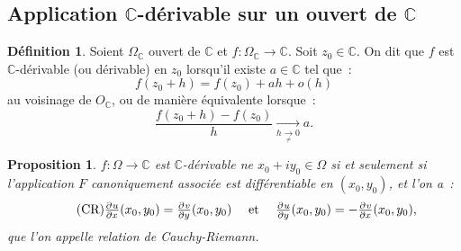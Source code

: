 \documentclass{report}
\newtheorem{prp}[thm]{Proposition}
\theoremstyle{definition}
\newtheorem{déf}[thm]{Définition}
\theoremstyle{remark}
\numberwithin{equation}{section}
\newcommand{\C}{\mathbb C}
\begin{document}
		\subsection{Application $\C$-dérivable sur un ouvert de $\C$}
			\begin{déf} Soient $\Omega_\C$ ouvert de $\C$ et $f : \Omega_\C \to \C$. Soit $z_0 \in \C$. On dit que $f$ est $\C$-dérivable (ou dérivable) en $z_0$
			lorsqu'il existe $a \in \C$ tel que~:
			\begin{equation}
				f(z_0+h) = f(z_0) + ah + o(h)
			\end{equation}
			au voisinage de $O_\C$, ou de manière équivalente lorsque~:
			\begin{equation}
				\frac {f(z_0+h)-f(z_0)}h \xrightarrow[h \underset {\neq}{\to} 0]{} a.
			\end{equation}
			\end{déf}

			\begin{prp} $f : \Omega \to \C$ est $\C$-dérivable ne $x_0+iy_0 \in \Omega$ si et seulement si l'application $F$ canoniquement associée est différentiable en
			$(x_0, y_0)$, et l'on a~:
			\begin{equation}\label{eq:Cauchy-Riemann}\tag{CR}
				\pd ux(x_0, y_0) = \pd vy(x_0, y_0) \quad \text{ et } \quad \pd uy(x_0, y_0) = -\pd vx(x_0, y_0),
			\end{equation}
			que l'on appelle \textit{relation de Cauchy-Riemann}.
			\end{prp}
\end{document}
